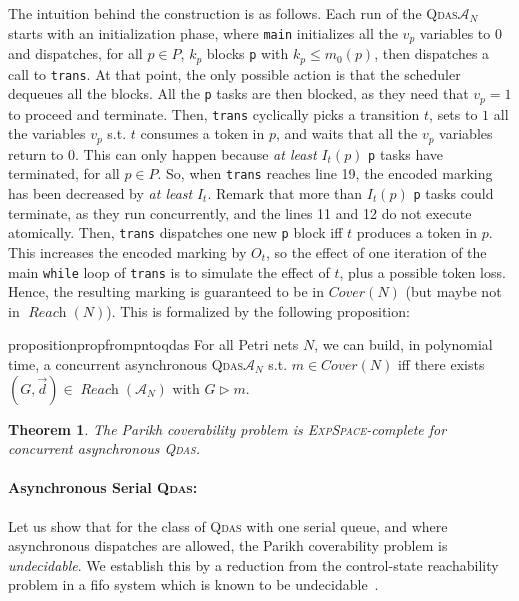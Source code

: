 \documentclass[runningheads,oribibl,]{article}
\newcommand{\Aa}{\ensuremath{\mathcal{A}}\xspace}
\newcommand{\qdas}{\textsc{Qdas}\xspace}
\newcommand{\fifo}{fifo\xspace}
\newcommand{\dexpspace}{\textsc{ExpSpace}\xspace}
\DeclareMathOperator{\Reach}{\textit{Reach}}
\newcommand{\Cover}{\ensuremath{\textit{Cover}}}
\newcommand{\Reachloss}{\Cover}
\newcommand{\Data}{\ensuremath{\vec{d}}}
\newtheorem{theorem}{Theorem}{}
\begin{document}
The intuition behind the construction is as follows. Each run of the
\qdas $\Aa_N$ starts with an initialization phase, where \texttt{main}
initializes all the $v_p$ variables to $0$ and dispatches, for all
$p\in P$, $k_p$ blocks \texttt{p} with $k_p\leq m_0(p)$, then
dispatches a call to \texttt{trans}. At that point, the only possible
action is that the scheduler dequeues all the blocks. All the
\texttt{p} tasks are then blocked, as they need that $v_p=1$ to
proceed and terminate. Then, \texttt{trans} cyclically picks a
transition $t$, sets to $1$ all the variables $v_p$ s.t.  $t$ consumes
a token in $p$, and waits that all the $v_p$ variables return to
$0$. This can only happen because \emph{at least} $I_t(p)$ \texttt{p}
tasks have terminated, for all $p\in P$. So, when \texttt{trans}
reaches line 19, the encoded marking has been decreased by \emph{at
  least} $I_t$. Remark that more than $I_t(p)$ \texttt{p} tasks could
terminate, as they run concurrently, and the lines 11 and 12 do not
execute atomically. Then, \texttt{trans} dispatches one new \texttt{p}
block iff $t$ produces a token in $p$. This increases the encoded
marking by $O_t$, so the effect of one iteration of the main
\texttt{while} loop of \texttt{trans} is to simulate the effect of
$t$, plus a possible token loss. Hence, the resulting marking is
guaranteed to be in $\Cover(N)$ (but maybe not in $\Reach(N)$). This
is formalized by the following proposition:

\begin{restatable}{proposition}{propfrompntoqdas}\label{prop:from-pn-to-qdas}
  For all Petri nets  $N$, we can build, in polynomial time, a concurrent
  asynchronous \qdas $\Aa_N$ s.t.  $m\in\Reachloss(N)$ iff there
  exists $(G,\Data)\in\Reach(\Aa_N)$ with $G\rhd m$.
\end{restatable}

\begin{theorem}\label{thm:concasyncqdas}
  The Parikh coverability problem
  is \dexpspace-complete for concurrent asynchronous \qdas.
\end{theorem}

\paragraph{\bf Asynchronous Serial \qdas:}

Let us show that for the class
of \qdas with one serial queue, and where asynchronous dispatches are
allowed, the Parikh coverability problem is \emph{undecidable}. We
establish this by a reduction from the control-state  reachability
problem in a \fifo system which is known to be
undecidable~\cite{brand-d-1983-323-a}.
\end{document}

